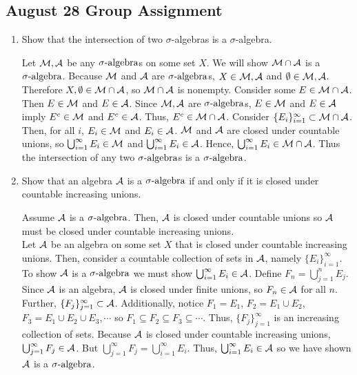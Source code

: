 \subsection{August 28 Group Assignment}
\begin{enumerate}


\item Show that the intersection of two $\sigma$-algebras is a $\sigma$-algebra.\begin{pf}
	Let ${\mathcal M}, {\mathcal A}$ be any ${\sigma}\text{-algebra}$s on some set $X$. We will show ${\mathcal M} \cap {\mathcal A}$ is a ${\sigma}\text{-algebra}$. Because ${\mathcal M}$ and ${\mathcal A}$ are ${\sigma}\text{-algebra}$s, $X \in {\mathcal M}, {\mathcal A}$ and $\emptyset \in {\mathcal M}, {\mathcal A}$. Therefore $X, \emptyset \in {\mathcal M} \cap {\mathcal A}$, so ${\mathcal M} \cap {\mathcal A}$ is nonempty. Consider some $E \in {\mathcal M} \cap {\mathcal A}$. Then $E \in {\mathcal M}$ and $E \in {\mathcal A}$. Since ${\mathcal M}, {\mathcal A}$ are ${\sigma}\text{-algebra}$s, $E \in {\mathcal M}$ and $E \in {\mathcal A}$ imply $E^c \in {\mathcal M}$ and $E^c \in {\mathcal A}$. Thus, $E^c \in {\mathcal M} \cap {\mathcal A}$. Consider $\{E_i\}_{i=1}^\infty \subset {\mathcal M} \cap {\mathcal A}$. Then, for all $i$, $E_i \in {\mathcal M}$ and $E_i \in {\mathcal A}$. ${\mathcal M}$ and ${\mathcal A}$ are closed under countable unions, so $\bigcup_{i=1}^\infty E_i \in {\mathcal M}$ and $\bigcup_{i=1}^\infty E_i \in {\mathcal A}$. Hence, $\bigcup_{i=1}^\infty E_i \in {\mathcal M}\cap {\mathcal A}$. Thus the intersection of any two ${\sigma}\text{-algebra}$s is a ${\sigma}\text{-algebra}$. 
\end{pf}


\item Show that an algebra ${\mathcal A}$ is a ${\sigma}\text{-algebra}$ if and only if it is closed under countable increasing unions.

\begin{pf}
Assume ${\mathcal A}$ is a ${\sigma}\text{-algebra}$. Then, ${\mathcal A}$ is closed under countable unions so ${\mathcal A}$ must be closed under countable increasing unions. \\

Let ${\mathcal A}$ be an algebra on some set $X$ that is closed under countable increasing unions. Then, consider a countable collection of sets in ${\mathcal A}$, namely $\{E_i\}_{i=1}^\infty$. To show ${\mathcal A}$ is a ${\sigma}\text{-algebra}$ we must show $\bigcup _{i=1}^\infty E_i \in {\mathcal A}$. Define $F_n = \bigcup _{j=1}^n E_j$. Since ${\mathcal A}$ is an algebra, ${\mathcal A}$ is closed under finite unions, so $F_n \in {\mathcal A}$ for all $n$. Further, $\{F_j \}_{j=1}^\infty \subset {\mathcal A}$. Additionally, notice $F_1=E_1$, $F_2 = E_1 \cup E_2$, $F_3 = E_1 \cup E_2 \cup E_3, \cdots$ so $F_1 \subseteq F_2 \subseteq F_3 \subseteq \cdots$. Thus, $\{F_j \}_{j=1}^\infty$ is an increasing collection of sets. Because ${\mathcal A}$ is closed under countable increasing unions, $\bigcup_{j=1}^\infty F_j \in {\mathcal A}$. But $\bigcup_{j=1}^\infty F_j = \bigcup _{i=1}^\infty E_i $. Thus, $\bigcup _{i=1}^\infty E_i \in {\mathcal A}$ so we have shown ${\mathcal A}$ is a ${\sigma}\text{-algebra}$. 
\end{pf}


\end{enumerate}
